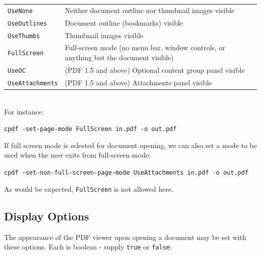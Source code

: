 \documentclass{book}
\begin{document}
\vspace{2mm}
  {\small\begin{tabular}{ll}
    \texttt{UseNone} & \vspace{2mm} \parbox{8cm}{Neither document outline nor thumbnail images visible} \\
    \texttt{UseOutlines} & \vspace{2mm} \parbox{8cm}{Document outline (bookmarks) visible} \\
    \texttt{UseThumbs} & \vspace{2mm} \parbox{8cm}{Thumbnail images visible} \\
    \texttt{FullScreen} & \vspace{2mm} \parbox{8cm}{Full-screen mode (no menu bar, window controls, or anything but the document visible)} \\
    \texttt{UseOC} & \vspace{2mm} \parbox{8cm}{(PDF 1.5 and above) Optional content group panel visible} \\
    \texttt{UseAttachments} & \vspace{2mm} \parbox{8cm}{(PDF 1.5 and above) Attachments panel visible}
  \end{tabular}}\\

  \noindent For instance:

  \begin{framed}
    \noindent\small\verb!cpdf -set-page-mode FullScreen in.pdf -o out.pdf!
  \end{framed}
  
  \noindent If full screen mode is selected for document opening, we can also set a mode to be used when the user exits from full-screen mode:

  \begin{framed}
    \noindent\small\verb!cpdf -set-non-full-screen-page-mode UseAttachments in.pdf -o out.pdf!
  \end{framed}

  \noindent As would be expected, \texttt{FullScreen} is not allowed here.
  
  \subsection{Display Options}

The appearance of the PDF viewer upon opening a document may be set with these options. Each is boolean - supply \texttt{true} or \texttt{false}:
\end{document}
